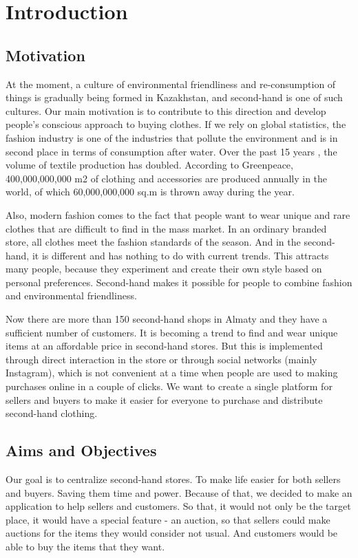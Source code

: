 \chapter{Introduction}\label{ch:intro}
\section{Motivation}
At the moment, a culture of environmental friendliness and re-consumption of things is gradually being formed in Kazakhstan, and second-hand is one of such cultures. Our main motivation is to contribute to this direction and develop people's conscious approach to buying clothes. 
If we rely on global statistics, the fashion industry is one of the industries that pollute the environment and is in second place in terms of consumption after water. Over the past 15 years \cite{stylerbc}, the volume of textile production has doubled. According to Greenpeace, 400,000,000,000 m2 of clothing and accessories are produced annually in the world, of which 60,000,000,000 sq.m is thrown away during the year\cite{greenpeace}. 

Also, modern fashion comes to the fact that people want to wear unique and rare clothes that are difficult to find in the mass market. In an ordinary branded store, all clothes meet the fashion standards of the season. And in the second-hand, it is different and has nothing to do with current trends. This attracts many people, because they experiment and create their own style based on personal preferences. Second-hand makes it possible for people to combine fashion and environmental friendliness.

Now there are more than 150 second-hand shops in Almaty and they have a sufficient number of customers. It is becoming a trend to find and wear unique items at an affordable price in second-hand stores. But this is implemented through direct interaction in the store or through social networks (mainly Instagram), which is not convenient at a time when people are used to making purchases online in a couple of clicks. We want to create a single platform for sellers and buyers to make it easier for everyone to purchase and distribute second-hand clothing.


\section{Aims and Objectives}
Our goal is to centralize second-hand stores. To make life easier for both sellers and buyers. Saving them time and power. Because of that, we decided to make an application to help sellers and customers. So that, it would not only be the target place, it would have a special feature - an auction, so that sellers could make auctions for the items they would consider not usual. And customers would be able to buy the items that they want.


